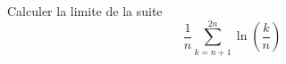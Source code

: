 Calculer la limite de la suite 
\begin{displaymath}
 \dfrac{1}{n}\sum_{k=n+1}^{2n}\ln\left( \dfrac{k}{n}\right) 
\end{displaymath}

 \bigskip